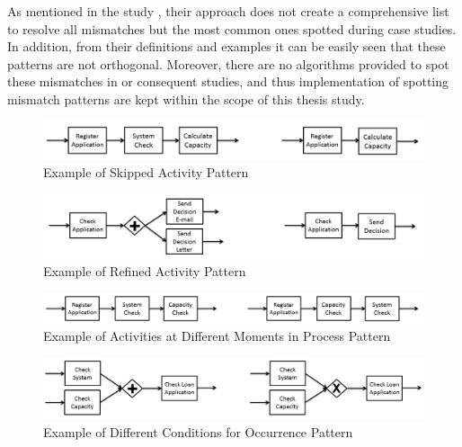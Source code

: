 As mentioned in the study \cite{dijkman2007mismatch}, their approach does not create a comprehensive list to resolve all mismatches but the most common ones spotted during case studies. In addition, from their definitions and examples it can be easily seen that these patterns are not orthogonal. Moreover, there are no algorithms provided to spot these mismatches in \cite{dijkman2007mismatch} or consequent studies, and thus implementation of spotting mismatch patterns are kept within the scope of this thesis study.

       \begin{figure}
      \centering
      \includegraphics[width=\textwidth]{3_background/mismatch-patterns-skipped-activity}
      \caption{Example of Skipped Activity Pattern}
      \label{fig:skipped-activity}
      \end{figure}
      \begin{figure}
      \centering
      \includegraphics[width=\textwidth]{3_background/mismatch-patterns-refined-activity}
      \caption{Example of Refined Activity Pattern}
      \label{fig:refined-activity}
      \end{figure}
      \begin{figure}
      \centering
      \includegraphics[width=\textwidth]{3_background/mismatch-patterns-different-moments}
      \caption{Example of Activities at Different Moments in Process Pattern}
      \label{fig:different-moments}
      \end{figure}
      \begin{figure}
      \centering
      \includegraphics[width=\textwidth]{3_background/mismatch-patterns-different-conditions}
      \caption{Example of Different Conditions for Occurrence Pattern}
      \label{fig:different-conditions}
      \end{figure}
